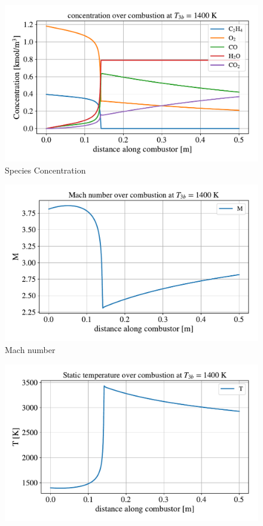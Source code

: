 \documentclass[a4paper]{article}
\begin{document}
\begin{widefigure}[10mm]
    \centering
    \begin{subfigure}[h]{0.49\linewidth}
        \includegraphics[width=\linewidth]{part_2_img/concentration_1400.pdf}
        \caption{Species Concentration}
        \label{subfig:concentration_1400}
    \end{subfigure}
    \begin{subfigure}[h]{0.49\linewidth}
        \includegraphics[width=\linewidth]{part_2_img/mach_1400.pdf}
        \caption{Mach number}
        \label{subfig:mach_1400}
    \end{subfigure}
    \begin{subfigure}[h]{0.49\linewidth}
        \includegraphics[width=\linewidth]{part_2_img/static_temp_1400.pdf}

\end{subfigure}
\end{widefigure}
\end{document}
